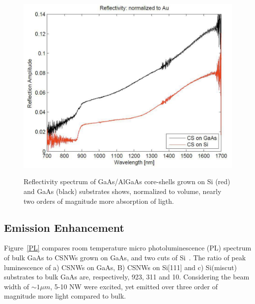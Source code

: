 \begin{figure}
  \caption{Reflectivity spectrum of GaAs/AlGaAs core-shells grown on Si (red) and GaAs (black) substrates shows, normalized to volume, nearly two orders of magnitude more absorption of ligth.}
  \centering
  \includegraphics[width=\textwidth]{pictures/Data/reflectCSNW}
  \label{reflectCSNW}
\end{figure}

\subsection{Emission Enhancement} \label{Dust_data}

Figure~\ref{PL} compares room temperature micro photoluminescence (PL) spectrum
of bulk GaAs to CSNWs grown on GaAs, and two cuts of Si~\cite{Currie:2013to}.
The ratio of peak luminescence of a) CSNWs on GaAs, B) CSNWs on Si[111] and c)
Si(miscut) substrates to bulk GaAs are, respectively, 923, 311 and 10.
Considering the beam width of $\sim1{\mu}m$, 5-10 NW were excited, yet emitted
over three order of magnitude more light compared to bulk.

